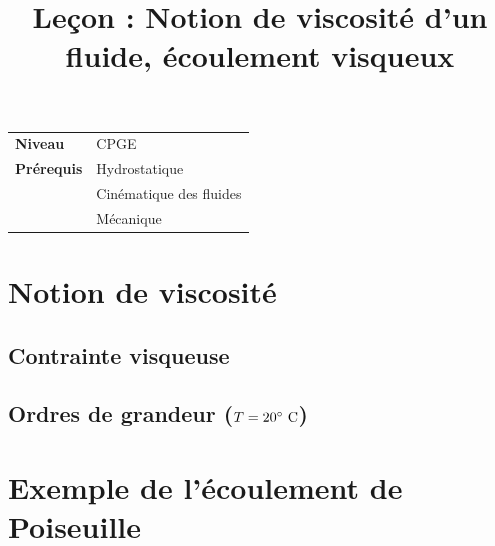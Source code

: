 \documentclass[10pt]{beamer}
\title{Leçon : Notion de viscosité d'un fluide, écoulement visqueux}
\begin{document}
\begin{frame}{}
    \titlepage

    \begin{tabularx}{\textwidth}{l@{:\,\,}X}
        \textbf{Niveau} 	  & CPGE\\
        \textbf{Prérequis} & Hydrostatique\\
        &			Cinématique des fluides\\
        & 			Mécanique
    \end{tabularx}
\end{frame}

\begin{frame}
    \tableofcontents
\end{frame}
\section{Notion de viscosité}
\subsection{Contrainte visqueuse}
\subsection{Ordres de grandeur ($T=20^\circ~\rm C$)}
\begin{frame}
    \begin{table}
        \centering
    \caption{Cours de Marc Rabaud \url{http://www.fast.u-psud.fr/~rabaud/NotesCours_Agreg.pdf}}
\end{table}
\end{frame}

\section{Exemple de l'écoulement de Poiseuille}
\end{document}
